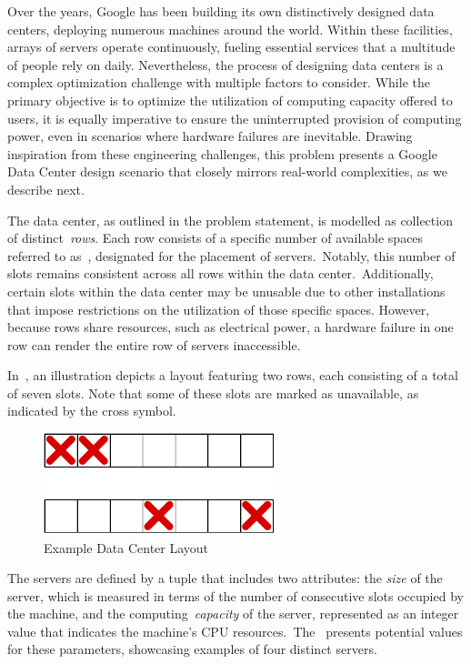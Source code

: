 Over the years, Google has been building its own distinctively designed data
centers, deploying numerous machines around the world. Within these facilities,
arrays of servers operate continuously, fueling essential services that a
multitude of people rely on daily. Nevertheless, the process of designing data
centers is a complex optimization challenge with multiple factors to consider.
While the primary objective is to optimize the utilization of computing capacity
offered to users, it is equally imperative to ensure the uninterrupted provision
of computing power, even in scenarios where hardware failures are inevitable.
Drawing inspiration from these engineering challenges, this problem presents a
Google Data Center design scenario that closely mirrors real-world complexities,
as we describe next.

The data center, as outlined in the problem statement, is modelled as collection
of distinct~\textit{rows}. Each row consists of a specific number of available
spaces referred to as~, designated for the placement of
servers.~Notably, this number of slots remains consistent across all rows within
the data center.~Additionally, certain slots within the data center may be
unusable due to other installations that impose restrictions on the utilization
of those specific spaces. However, because rows share resources, such as
electrical power, a hardware failure in one row can render the entire row of
servers inaccessible.

In~, an illustration depicts a layout featuring two
rows, each consisting of a total of seven slots. Note that some of these slots
are marked as unavailable, as indicated by the cross symbol.

\begin{figure}[h]
  \centering
  \includegraphics[width=0.6\textwidth,keepaspectratio]{../assets/dc/dc-rows-no-labels.pdf}
  \caption{Example Data Center Layout}
  \label{fig:data-center-layout}
\end{figure}

The servers are defined by a tuple that includes two attributes: the
\textit{size} of the server, which is measured in terms of the number of
consecutive slots occupied by the machine, and the computing~\textit{capacity}
of the server, represented as an integer value that indicates the machine's CPU
resources.~The~ presents potential values for
these parameters, showcasing examples of four distinct servers.

